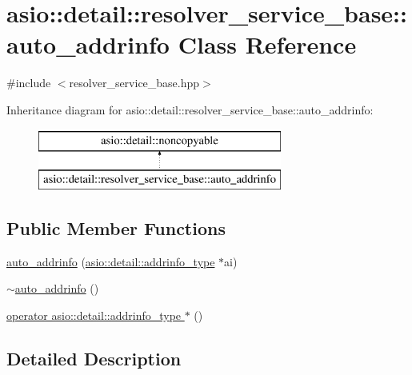 \hypertarget{classasio_1_1detail_1_1resolver__service__base_1_1auto__addrinfo}{}\section{asio\+:\+:detail\+:\+:resolver\+\_\+service\+\_\+base\+:\+:auto\+\_\+addrinfo Class Reference}
\label{classasio_1_1detail_1_1resolver__service__base_1_1auto__addrinfo}


{\ttfamily \#include $<$resolver\+\_\+service\+\_\+base.\+hpp$>$}

Inheritance diagram for asio\+:\+:detail\+:\+:resolver\+\_\+service\+\_\+base\+:\+:auto\+\_\+addrinfo\+:\begin{figure}[H]
\begin{center}
\leavevmode
\includegraphics[height=2.000000cm]{classasio_1_1detail_1_1resolver__service__base_1_1auto__addrinfo}
\end{center}
\end{figure}
\subsection*{Public Member Functions}
\begin{DoxyCompactItemize}
\item 
\hyperlink{classasio_1_1detail_1_1resolver__service__base_1_1auto__addrinfo_a25e9f825df34740e06b34cdf0386b26a}{auto\+\_\+addrinfo} (\hyperlink{namespaceasio_1_1detail_ad8df56a17e3aa9ce2ad251fb76426e67}{asio\+::detail\+::addrinfo\+\_\+type} $\ast$ai)
\item 
\hyperlink{classasio_1_1detail_1_1resolver__service__base_1_1auto__addrinfo_a469491701619048157610db18eea922a}{$\sim$auto\+\_\+addrinfo} ()
\item 
\hyperlink{classasio_1_1detail_1_1resolver__service__base_1_1auto__addrinfo_a4ee7e139a519c6bc31c41f8bafbbc46a}{operator asio\+::detail\+::addrinfo\+\_\+type $\ast$} ()
\end{DoxyCompactItemize}


\subsection{Detailed Description}


